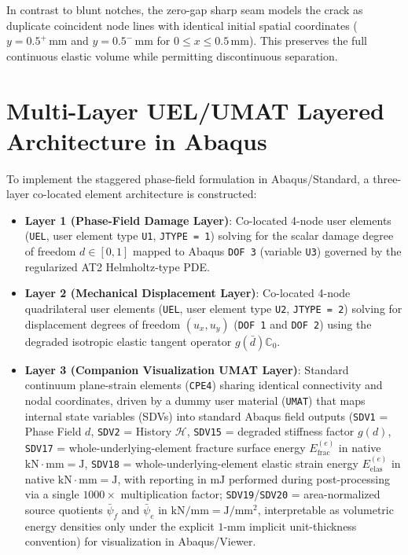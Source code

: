 In contrast to blunt notches, the zero-gap sharp seam models the crack as duplicate coincident node lines with identical initial spatial coordinates ($y = 0.5^+\,\text{mm}$ and $y = 0.5^-\,\text{mm}$ for $0 \le x \le 0.5\,\text{mm}$). This preserves the full continuous elastic volume while permitting discontinuous separation.

\section{Multi-Layer UEL/UMAT Layered Architecture in Abaqus}
\label{sec:uel_architecture_abaqus}

To implement the staggered phase-field formulation in Abaqus/Standard, a three-layer co-located element architecture is constructed:
\begin{itemize}
    \item \textbf{Layer 1 (Phase-Field Damage Layer)}: Co-located 4-node user elements (\texttt{UEL}, user element type \texttt{U1}, \texttt{JTYPE = 1}) solving for the scalar damage degree of freedom $d \in [0, 1]$ mapped to Abaqus \texttt{DOF 3} (variable \texttt{U3}) governed by the regularized AT2 Helmholtz-type PDE.
    \item \textbf{Layer 2 (Mechanical Displacement Layer)}: Co-located 4-node quadrilateral user elements (\texttt{UEL}, user element type \texttt{U2}, \texttt{JTYPE = 2}) solving for displacement degrees of freedom $(u_x, u_y)$ (\texttt{DOF 1} and \texttt{DOF 2}) using the degraded isotropic elastic tangent operator $g(\bar{d})\mathbb{C}_0$.
    \item \textbf{Layer 3 (Companion Visualization UMAT Layer)}: Standard continuum plane-strain elements (\texttt{CPE4}) sharing identical connectivity and nodal coordinates, driven by a dummy user material (\texttt{UMAT}) that maps internal state variables (SDVs) into standard Abaqus field outputs (\texttt{SDV1} = Phase Field $d$, \texttt{SDV2} = History $\mathcal{H}$, \texttt{SDV15} = degraded stiffness factor $g(d)$, \texttt{SDV17} = whole-underlying-element fracture surface energy $E_{\mathrm{frac}}^{(e)}$ in native $\mathrm{kN\cdot mm} = \mathrm{J}$, \texttt{SDV18} = whole-underlying-element elastic strain energy $E_{\mathrm{elas}}^{(e)}$ in native $\mathrm{kN\cdot mm} = \mathrm{J}$, with reporting in $\mathrm{mJ}$ performed during post-processing via a single $1000\times$ multiplication factor; \texttt{SDV19}/\texttt{SDV20} = area-normalized source quotients $\bar{\psi}_f$ and $\bar{\psi}_e$ in $\mathrm{kN/mm} = \mathrm{J/mm^2}$, interpretable as volumetric energy densities only under the explicit $1\text{-}\mathrm{mm}$ implicit unit-thickness convention) for visualization in Abaqus/Viewer.
\end{itemize}

